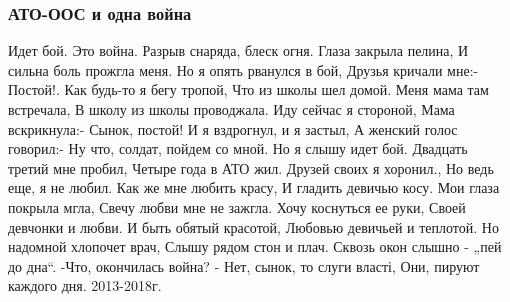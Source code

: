  
 
 

\subsubsection{АТО-ООС и одна война}
\label{sec:poetry.rus.sokor.ato_oos_vojna}

Идет бой. Это война.
Разрыв снаряда, блеск огня.
Глаза закрыла пелина,
И сильна боль прожгла меня.
Но я опять рванулся в бой,
Друзья кричали мне:- Постой!.
Как будь-то я бегу тропой,
Что из школы шел домой.
Меня мама там встречала,
В школу из школы проводжала.
Иду сейчас я стороной,
Мама вскрикнула:- Сынок, постой!
И я вздрогнул, и я застыл,
А женский голос говорил:-
Ну что, солдат, пойдем со мной.
Но я слышу идет бой.
Двадцать третий мне пробил,
Четыре года в АТО жил.
Друзей своих я хоронил.,
Но ведь еще, я не любил.
Как же мне любить красу,
И гладить девичью косу.
Мои глаза покрыла мгла,
Свечу любви мне не зажгла.
Хочу коснуться ее руки,
Своей девчонки и любви.
И быть обятый красотой,
Любовью девичьей и теплотой.
Но надомной хлопочет врач,
Слышу рядом стон и плач.
Сквозь окон слышно - „пей до дна“.
-Что, окончилась война?
- Нет, сынок, то слуги власті,
Они, пируют каждого дня.
2013-2018г.
